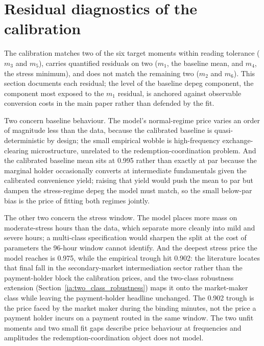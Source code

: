 \section{Residual diagnostics of the calibration}\label{sub:residual_diagnostics}\label{sub:residuals}

The calibration matches two of the six target moments within reading tolerance ($m_3$ and $m_5$), carries quantified residuals on two ($m_1$, the baseline mean, and $m_4$, the stress minimum), and does not match the remaining two ($m_2$ and $m_6$). This section documents each residual; the level of the baseline depeg component, the component most exposed to the $m_1$ residual, is anchored against observable conversion costs in the main paper rather than defended by the fit.

Two concern baseline behaviour. The model's normal-regime price varies an order of magnitude less than the data, because the calibrated baseline is quasi-deterministic by design; the small empirical wobble is high-frequency exchange-clearing microstructure, unrelated to the redemption-coordination problem. And the calibrated baseline mean sits at 0.995 rather than exactly at par because the marginal holder occasionally converts at intermediate fundamentals given the calibrated convenience yield; raising that yield would push the mean to par but dampen the stress-regime depeg the model must match, so the small below-par bias is the price of fitting both regimes jointly.

The other two concern the stress window. The model places more mass on moderate-stress hours than the data, which separate more cleanly into mild and severe hours; a multi-class specification would sharpen the split at the cost of parameters the 96-hour window cannot identify. And the deepest stress price the model reaches is 0.975, while the empirical trough hit 0.902: the literature locates that final fall in the secondary-market intermediation sector \citep{ma_zeng_zhang_2025, gorton_klee_ross_ross_vardoulakis_2026} rather than the payment-holder block the calibration prices, and the two-class robustness extension (Section~\ref{ia:two_class_robustness}) maps it onto the market-maker class while leaving the payment-holder headline unchanged. The 0.902 trough is the price faced by the market maker during the binding minutes, not the price a payment holder incurs on a payment routed in the same window. The two unfit moments and two small fit gaps describe price behaviour at frequencies and amplitudes the redemption-coordination object does not model.

